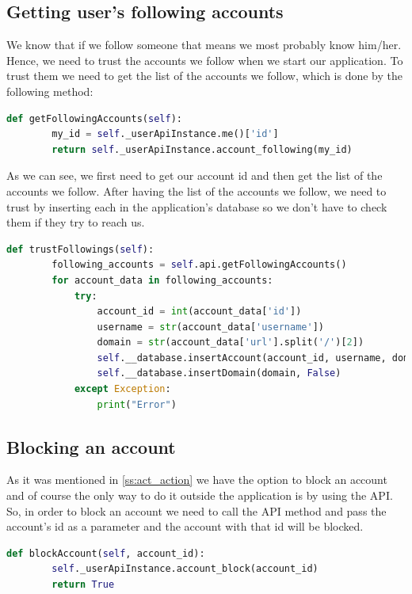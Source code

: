 \subsection{Getting user's following accounts}
We know that if we follow someone that means we most probably know him/her. Hence, we need to trust the accounts we follow when we start our application. To trust them we need to get the list of the accounts we follow, which is done by the following method:
\\[5pt]
\begin{lstlisting}[language=python, caption={Method to get the list of the accounts we follow}, captionpos=b]
	def getFollowingAccounts(self):
		my_id = self._userApiInstance.me()['id']
		return self._userApiInstance.account_following(my_id)
\end{lstlisting}
As we can see, we first need to get our account id and then get the list of the accounts we follow. After having the list of the accounts we follow, we need to trust by inserting each in the application's database so we don't have to check them if they try to reach us.
\\[5pt]
\begin{lstlisting}[language=python, caption={Inserting the accounts we follow immediately in the application's database}, captionpos=b]
	def trustFollowings(self):
		following_accounts = self.api.getFollowingAccounts()   
		for account_data in following_accounts:
			try:
				account_id = int(account_data['id'])
				username = str(account_data['username'])
				domain = str(account_data['url'].split('/')[2])
				self.__database.insertAccount(account_id, username, domain, False)
				self.__database.insertDomain(domain, False)
			except Exception:
				print("Error")
\end{lstlisting}
\subsection{Blocking an account}
As it was mentioned in \ref{ss:act_action} we have the option to block an account and of course the only way to do it outside the application is by using the API. So, in order to block an account we need to call the API method and pass the account's id as a parameter
and the account with that id will be blocked.
\\[5pt]
\begin{lstlisting}[language=python, caption={Blocking an account method}, captionpos=b]
	def blockAccount(self, account_id):
		self._userApiInstance.account_block(account_id)
		return True
\end{lstlisting}
